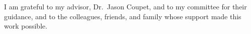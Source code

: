 I am grateful to my advisor, Dr.\ Jason Coupet, and to my committee for their guidance, and to the colleagues, friends, and family whose support made this work possible.
